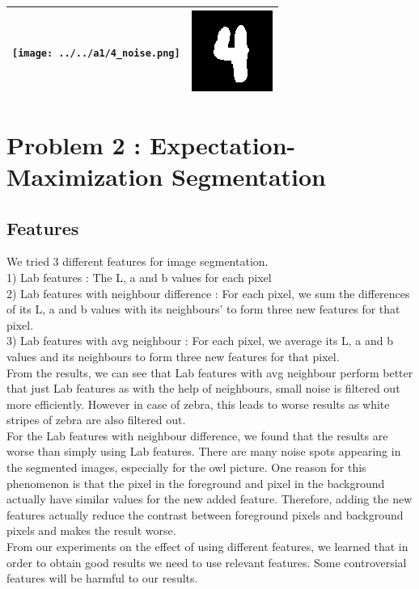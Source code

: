 \documentclass{article}
\begin{document}
\begin{center}
 \begin{tabular}{||c c||}
 \hline
 \texttt{[image: ../../a1/4\_noise.png]} & \includegraphics[width=.4\linewidth]{../image-denoising/output/4_denoise.png} \\ 
 \hline

\end{tabular}
\end{center}


\section{Problem 2 : Expectation-Maximization Segmentation}
\subsection{Features}
We tried 3 different features for image segmentation.\\
1) Lab features : The L, a and b values for each pixel \\
2) Lab features with neighbour difference : For each pixel, we sum the differences of its L, a and b values with its neighbours' to form three new features for that pixel. \\
3) Lab features with avg neighbour : For each pixel, we average its L, a and b values and its neighbours to form three new features for that pixel. \\

From the results, we can see that Lab features with avg neighbour perform better that just Lab features as with the help of neighbours, small noise is filtered out more efficiently. However in case of zebra, this leads to worse results as white stripes of zebra are also filtered out. \\
For the Lab features with neighbour difference, we found that the results are worse than simply using Lab features. There are many noise spots appearing in the segmented images, especially for the owl picture. One reason for this phenomenon is that the pixel in the foreground and pixel in the background actually have similar values for the new added feature. Therefore, adding the new features actually reduce the contrast between foreground pixels and background pixels and makes the result worse. \\
From our experiments on the effect of using different features, we learned that in order to obtain good results we need to use relevant features. Some controversial features will be harmful to our results. 
\end{document}
